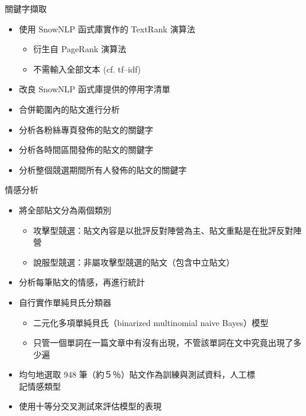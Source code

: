 \documentclass{beamer}
\begin{document}
\begin{CJK}{UTF8}{bkai}
\begin{frame}{關鍵字擷取}
\begin{itemize}
\item 使用 SnowNLP 函式庫實作的 TextRank 演算法
  \begin{itemize}
  \item 衍生自 PageRank 演算法
  \item 不需輸入全部文本 (cf. tf--idf)
  \end{itemize}
\item 改良 SnowNLP 函式庫提供的停用字清單
\item 合併範圍內的貼文進行分析
\item 分析各粉絲專頁發佈的貼文的關鍵字
\item 分析各時間區間發佈的貼文的關鍵字
\item 分析整個競選期間所有人發佈的貼文的關鍵字
\end{itemize}
\end{frame}

\begin{frame}{情感分析}
\begin{itemize}
\item 將全部貼文分為兩個類別
  \begin{itemize}
  \item 攻擊型競選：貼文內容是以批評反對陣營為主、貼文重點是在批評反對陣營
  \item 說服型競選：非屬攻擊型競選的貼文（包含中立貼文）
  \end{itemize}
\item 分析每筆貼文的情感，再進行統計
\item 自行實作單純貝氏分類器
  \begin{itemize}
  \item 二元化多項單純貝氏（binarized multinomial naive Bayes）模型
  \item 只管一個單詞在一篇文章中有沒有出現，不管該單詞在文中究竟出現了多少遍
  \end{itemize}
\item 均勻地選取 948 筆（約５％）貼文作為訓練與測試資料，人工標\\記情感類型
\item 使用十等分交叉測試來評估模型的表現
\end{itemize}
\end{frame}

\end{CJK}
\end{document}
